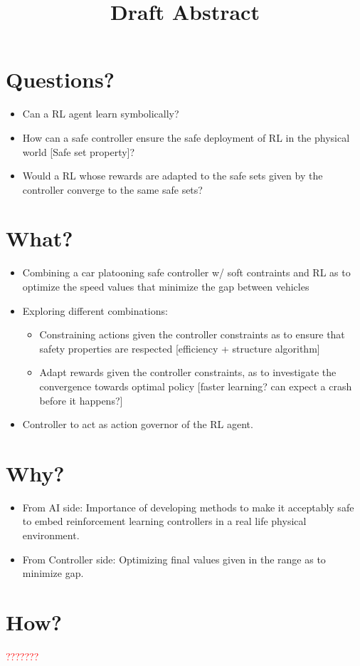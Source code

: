 \documentclass[a4paper,11pt]{article}
\begin{document}
\date{}

\title{Draft Abstract}


\maketitle 

\section{Questions?}
\begin{itemize}
    \item Can a RL agent learn symbolically? 
    \item How can a safe controller \cite{vnc20} ensure the safe deployment of RL in the physical world [Safe set property]?
    \item Would a RL whose rewards are adapted to the safe sets given by the controller converge to the same safe sets? 
\end{itemize}

\section{What?}
\begin{itemize}
    \item Combining a car platooning safe controller w/ soft contraints and RL as to optimize the speed values that minimize the gap between vehicles
    \item Exploring different combinations: 
            \begin{itemize}
                \item Constraining actions given the controller constraints as to ensure that safety properties are respected [efficiency + structure algorithm]
                \item Adapt rewards given the controller constraints, as to investigate the convergence towards optimal policy [faster learning? can expect a crash before it happens?]
            \end{itemize}
    \item Controller to act as action governor of the RL agent.
\end{itemize}
\section{Why?}
\begin{itemize}
    \item From AI side: Importance of developing methods to make it acceptably safe to embed reinforcement learning controllers in
          a real life physical environment.
    \item From Controller side: Optimizing final values given in the range as to minimize gap. 
\end{itemize}

\section{How?}
\textcolor{red}{???????}



\end{document}
